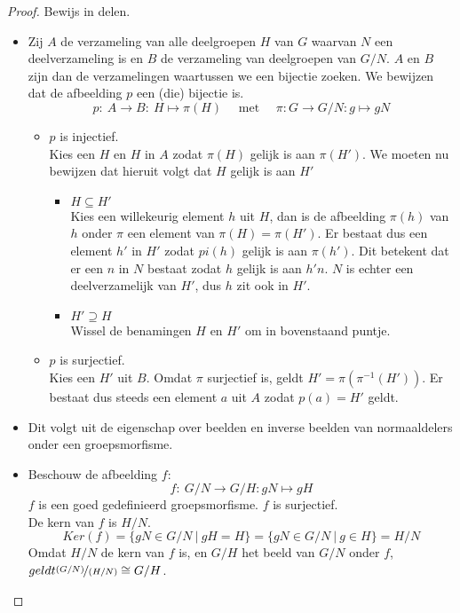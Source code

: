 \documentclass[main.tex]{subfiles}
\begin{document}
\begin{st}
  \begin{proof}
    Bewijs in delen.
    \begin{itemize}
    \item
      Zij $A$ de verzameling van alle deelgroepen $H$ van $G$ waarvan $N$ een deelverzameling is en $B$ de verzameling van deelgroepen van $G/N$.
      $A$ en $B$ zijn dan de verzamelingen waartussen we een bijectie zoeken.
      We bewijzen dat de afbeelding $p$ een (die) bijectie is.
      \[ p:\ A \rightarrow B:\ H \mapsto \pi(H) \quad\text{ met }\quad \pi: G \rightarrow G/N: g \mapsto gN \]
      \begin{itemize}
      \item $p$ is injectief.\\
        Kies een $H$ en $H$ in $A$ zodat $\pi(H)$ gelijk is aan $\pi(H')$.
        We moeten nu bewijzen dat hieruit volgt dat $H$ gelijk is aan $H'$
        \begin{itemize}
        \item $H \subseteq H'$\\
          Kies een willekeurig element $h$ uit $H$, dan is de afbeelding $\pi(h)$ van $h$ onder $\pi$ een element van $\pi(H) = \pi(H')$.
          Er bestaat dus een element $h'$ in $H'$ zodat $pi(h)$ gelijk is aan $\pi(h')$.
          Dit betekent dat er een $n$ in $N$ bestaat zodat $h$ gelijk is aan $h'n$.
          $N$ is echter een deelverzamelijk van $H'$, dus $h$ zit ook in $H'$.
        \item $H' \supseteq H$\\
          Wissel de benamingen $H$ en $H'$ om in bovenstaand puntje.
        \end{itemize}
      \item $p$ is surjectief.\\
        Kies een $H'$ uit $B$.
        Omdat $\pi$ surjectief is, \waarom geldt $H' = \pi(\pi^{-1}(H'))$.
        Er bestaat dus steeds een element $a$ uit $A$ zodat $p(a)=H'$ geldt. 
      \end{itemize}
    \item Dit volgt uit de eigenschap over beelden en inverse beelden van normaaldelers onder een groepsmorfisme. 
    \item Beschouw de afbeelding $f$:
      \[ f:\ G/N \rightarrow G/H: gN \mapsto gH \]
      $f$ is een goed gedefinieerd groepsmorfisme. \waarom
      $f$ is surjectief.\\ \waarom {}
      De kern van $f$ is $H/N$.
      \[ Ker(f) = \{ gN \in G/N \ |\ gH = H \} = \{ gN \in G/N \ |\ g \in H \} = H/N \]
      Omdat $H/N$ de kern van $f$ is, en $G/H$ het beeld van $G/N$ onder $f$, $geldt \nicefrac{(G/N)}{(H/N)} \cong G/H$.
    \end{itemize}
  \end{proof}
\end{st}
\end{document}
